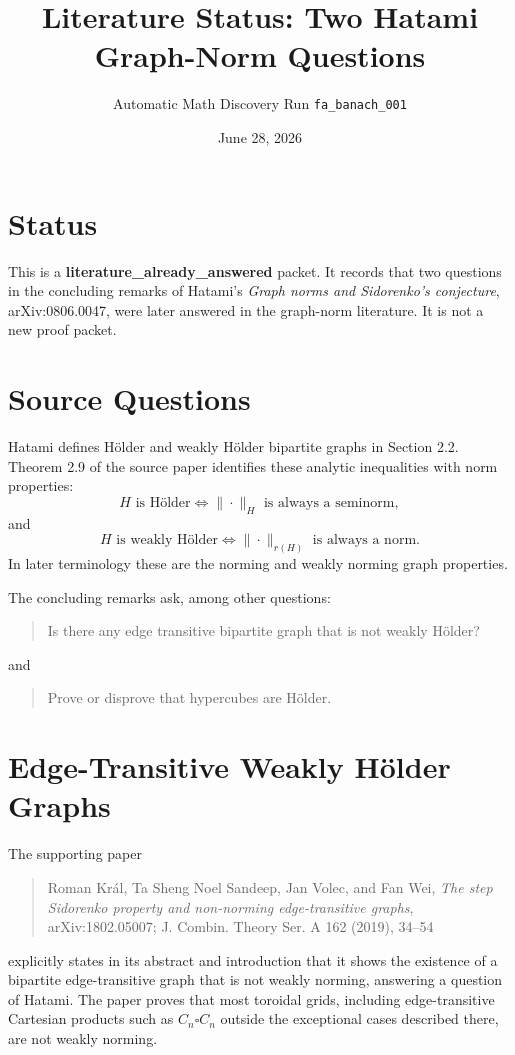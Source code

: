 \documentclass[11pt]{article}
\title{Literature Status: Two Hatami Graph-Norm Questions}
\author{Automatic Math Discovery Run \texttt{fa\_banach\_001}}
\date{June 28, 2026}
\newcommand{\Holder}{H\"older}
\newcommand{\WH}{weakly \Holder}
\begin{document}
\maketitle

\section*{Status}

This is a \textbf{literature\_already\_answered} packet. It records that two
questions in the concluding remarks of Hatami's
\emph{Graph norms and Sidorenko's conjecture}, arXiv:0806.0047, were later
answered in the graph-norm literature. It is not a new proof packet.

\section*{Source Questions}

Hatami defines \Holder{} and \WH{} bipartite graphs in Section 2.2. Theorem 2.9
of the source paper identifies these analytic inequalities with norm
properties:
\[
  H \text{ is \Holder} \Longleftrightarrow \|\cdot\|_H
  \text{ is always a seminorm},
\]
and
\[
  H \text{ is \WH} \Longleftrightarrow \|\cdot\|_{r(H)}
  \text{ is always a norm}.
\]
In later terminology these are the norming and weakly norming graph
properties.

The concluding remarks ask, among other questions:
\begin{quote}
Is there any edge transitive bipartite graph that is not weakly \Holder?
\end{quote}
and
\begin{quote}
Prove or disprove that hypercubes are \Holder.
\end{quote}

\section*{Edge-Transitive Weakly \Holder{} Graphs}

The supporting paper
\begin{quote}
Roman Kr\'al, Ta Sheng Noel Sandeep, Jan Volec, and Fan Wei,
\emph{The step Sidorenko property and non-norming edge-transitive graphs},
arXiv:1802.05007; J. Combin. Theory Ser. A 162 (2019), 34--54
\end{quote}
explicitly states in its abstract and introduction that it shows the existence
of a bipartite edge-transitive graph that is not weakly norming, answering a
question of Hatami. The paper proves that most toroidal grids, including
edge-transitive Cartesian products such as \(C_n \square C_n\) outside the
exceptional cases described there, are not weakly norming.
\end{document}
